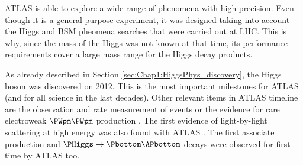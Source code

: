 

 ATLAS is able to explore a wide range of phenomena with high precision. Even though it is
 a general-purpose experiment, it was designed taking into account the Higgs and BSM pheomena searches that were carried out at LHC. This is
 why, since the mass of the Higgs was not known at that time, its performance requirements cover a large mass range for
 the Higgs decay products.

 
 \begin{comment}
 The stone for the foundations of ATLAS was laid in March 1992 at the critical ‘Towards the LHC Experimental Programme’ 
 meeting, where physicists proposed several possible experiments for the LHC \cite{LHC_CernCouncil_Experiments}. Two 
 projects based on large toroidal magnet systems were proposed EAGLE and ASCOT. %
  By the summer of that year, both experiments merged into ATLAS. In October 1992, the letter of intent of the ATLAS
 Collaboration was sent to the LHC Experiments committee and, in 1994, the technical proposal \cite{ATLAS_TechnicalProposal}.
 In 1997 the formal approval of the ATLAS experiment arrived and one year later the excavation on the cavern began.
 The cavern was inaugurated five years later and the construction of the ATLAS detector ended in 2008.  Later, in 2009, at
 $\CM = 2.36\,$TeV, ATLAS records its first collisions \cite{collaboration:1228300}. 
\end{comment}
 
 
 As already described in Section \ref{sec:Chap1:HiggsPhys_discovery}, the Higgs boson was discovered on 2012.
 This is the most important milestones for ATLAS (and for all science in the last decades).
 Other relevant items in ATLAS timeline are the observation and rate measurement of \ttbar events \cite{ATLAS:2010zaw} or
 the evidence for rare electroweak $\PWpm\PWpm$ production \cite{ATLAS:2014jzl}. The first evidence of light-by-light scattering 
 at high energy was also found with ATLAS \cite{ATLAS:2017fur}. The first \ttH associate production \cite{ATLAS:2017fak} and 
 $\PHiggs \rightarrow \Pbottom \APbottom$ decays \cite{ATLAS:2018kot} were observed for first time by ATLAS too.

